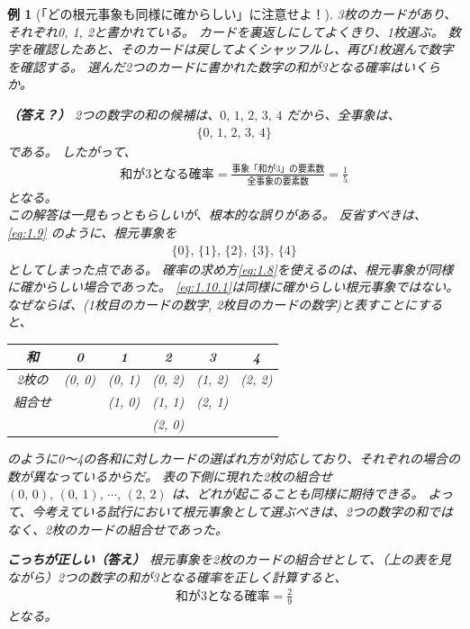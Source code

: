 \documentclass[12pt]{ltjsarticle}\usepackage{ifthen}\newcounter{enlarge}\setcounter{enlarge}{1}
\newtheorem{eg}{例}
\begin{document}
\begin{eg}[「どの根元事象も同様に確からしい」に注意せよ！] \label{eg:1.1}
  3枚のカードがあり、それぞれ0, 1, 2と書かれている。
  カードを裏返しにしてよくきり、1枚選ぶ。
  数字を確認したあと、そのカードは戻してよくシャッフルし、再び1枚選んで数字を確認する。
  選んだ2つのカードに書かれた数字の和が3となる確率はいくらか。

  \textbf{（答え？）}
  2つの数字の和の候補は、$0,\, 1,\, 2,\, 3,\, 4$ だから、全事象は、
  \begin{align}
    \{0,\, 1,\, 2,\, 3,\, 4\} \label{eq:1.9}
  \end{align}
  である。
  したがって、
  \begin{align}
    \text{和が3となる確率} = \frac{\text{事象「和が3」の要素数}}{\text{全事象の要素数}} = \frac{1}{5} \label{eq:1.10}
  \end{align}
  となる。\mbox{}\\

  この解答は一見もっともらしいが、根本的な誤りがある。
  反省すべきは、\eqref{eq:1.9} のように、根元事象を
  \begin{align}
    \{0\},\,\{1\},\,\{2\},\,\{3\},\,\{4\} \label{eq:1.10.1}
  \end{align}
  としてしまった点である。
  確率の求め方\eqref{eq:1.8}を使えるのは、根元事象が同様に確からしい場合であった。
  \eqref{eq:1.10.1}は同様に確からしい根元事象ではない。
  なぜならば、(1枚目のカードの数字, 2枚目のカードの数字)と表すことにすると、
  \begin{center}
  \begin{tabular}{c|ccccc} \hline
    和 & 0 & 1 & 2 & 3 & 4 \\ \hline
    2枚の & (0, 0) & (0, 1) & (0, 2) & (1, 2) & (2, 2) \\
    組合せ &  & (1, 0) & (1, 1) & (2, 1) &  \\
     &  &  & (2, 0) & & \\ \hline
  \end{tabular}
  \end{center}
  のように0〜4の各和に対しカードの選ばれ方が対応しており、それぞれの場合の数が異なっているからだ。
  表の下側に現れた2枚の組合せ $(0,\, 0),\, (0,\, 1),\, \cdots ,\, (2,\,2)$ は、どれが起こることも同様に期待できる。
  よって、今考えている試行において根元事象として選ぶべきは、2つの数字の和ではなく、2枚のカードの組合せであった。

  \textbf{こっちが正しい（答え）}
  根元事象を2枚のカードの組合せとして、（上の表を見ながら）2つの数字の和が3となる確率を正しく計算すると、
  \begin{align}
    \text{和が3となる確率} = \frac{2}{9} \label{eq:1.10}
  \end{align}
  となる。
\end{eg}
\end{document}

